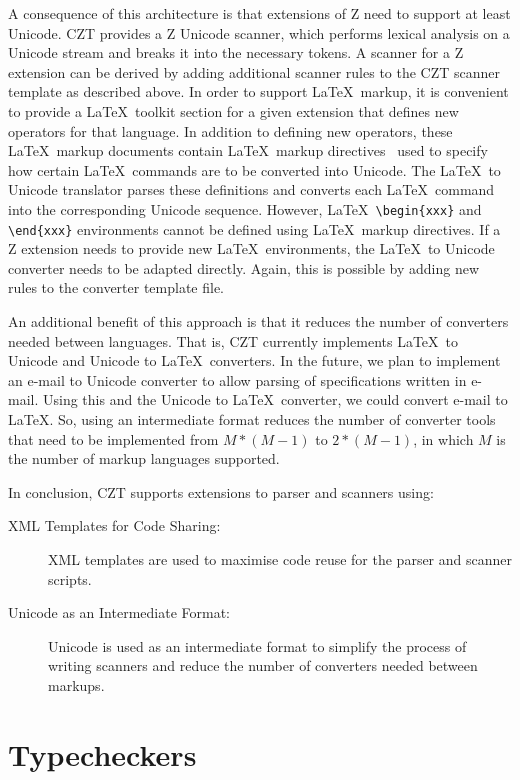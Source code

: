 \documentclass{llncs}
\begin{document}
A consequence of this architecture is that extensions of Z need
to support at least Unicode.  CZT provides a Z Unicode scanner, which
performs lexical analysis on a Unicode stream and breaks it into the
necessary tokens.  A scanner for a Z extension can be derived by
adding additional scanner rules to the CZT scanner template as
described above.  In order to support \LaTeX\ markup, it is convenient
to provide a \LaTeX\ toolkit section for a given extension that
defines new operators for that language.  In
addition to defining new operators, these \LaTeX\ markup documents
contain \LaTeX\ markup directives~\cite{isoz,czt} used to specify how
certain \LaTeX\ commands are to be converted into Unicode.  The
\LaTeX\ to Unicode translator parses these definitions and converts
each \LaTeX\ command into the corresponding Unicode sequence.
However, \LaTeX\ \verb+\begin{xxx}+ and \verb+\end{xxx}+ environments
cannot be defined using \LaTeX\ markup directives.  If a Z extension
needs to provide new \LaTeX\ environments, the \LaTeX\ to Unicode converter
needs to be adapted directly.  Again, this is possible by adding new
rules to the converter template file.

An additional benefit of this approach is that it reduces the number
of converters needed between languages. That is, CZT currently
implements \LaTeX\ to Unicode and Unicode to \LaTeX\ converters. In
the future, we plan to implement an e-mail to Unicode converter to
allow parsing of specifications written in e-mail. Using this and the
Unicode to \LaTeX\ converter, we could convert e-mail to \LaTeX. So,
using an intermediate format reduces the number of converter tools
that need to be implemented from $M*(M-1)$ to $2*(M-1)$, in which $M$
is the number of markup languages supported.

In conclusion, CZT supports extensions to parser and scanners using:
\begin{description}
  \item[XML Templates for Code Sharing:] XML templates are used
  to maximise code reuse for the parser and scanner scripts.
  \item[Unicode as an Intermediate Format:] Unicode is used as an
    intermediate format to simplify the process of writing scanners
    and reduce the number of converters needed between markups.
\end{description}


\section{Typecheckers}
\label{typecheckers}
\end{document}
